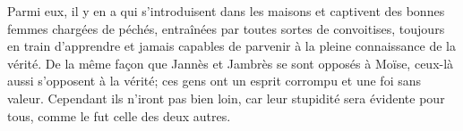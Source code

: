 Parmi eux, il y en a qui s’introduisent dans les maisons
	et captivent des bonnes femmes chargées de péchés,
	entraînées par toutes sortes de convoitises,
	toujours en train d’apprendre
		et jamais capables de parvenir à la pleine connaissance de la vérité.
De la même façon que Jannès et Jambrès se sont opposés à Moïse,
	ceux-là aussi s’opposent à la vérité;
	ces gens ont un esprit corrompu et une foi sans valeur.
Cependant ils n’iront pas bien loin,
	car leur stupidité sera évidente pour tous, comme le fut celle des deux autres.
